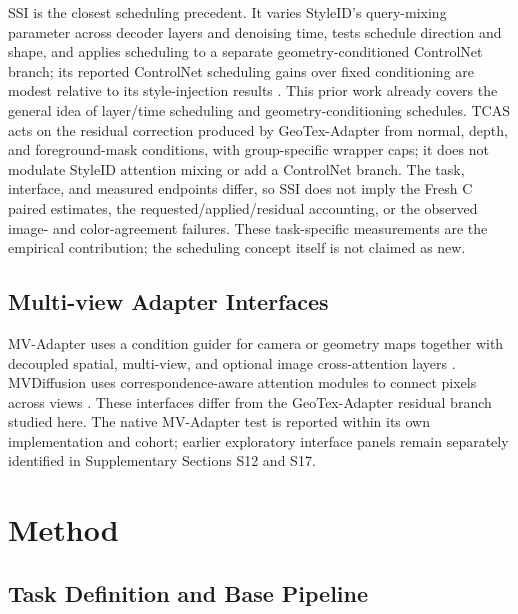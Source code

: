 \documentclass[times,twocolumn,final]{elsarticle}
\providecommand{\DIFadd}[1]{{\protect\color{blue} \sf #1}} %
\providecommand{\DIFaddbegin}{} %
\providecommand{\DIFaddend}{} %
\begin{document}
  \DIFaddbegin \DIFadd{SSI is the closest scheduling precedent. It varies StyleID's query-mixing parameter across decoder layers and denoising time, tests schedule direction and shape, and applies scheduling to a separate }\DIFaddend geometry-conditioned   \DIFaddbegin \DIFadd{ControlNet branch; its reported ControlNet scheduling gains over fixed conditioning are modest relative to its style-injection results \cite{kulkarni2026ssi}. This prior work already covers the general idea of layer/time scheduling and geometry-conditioning schedules. TCAS acts on the residual correction produced by GeoTex-Adapter from normal, depth, and foreground-mask conditions, with group-specific wrapper caps; it does not modulate StyleID attention mixing or add a ControlNet branch. The task, interface, and measured endpoints differ, so SSI does not imply the Fresh C paired estimates, the requested/applied/residual accounting, or the observed image- and color-agreement failures. These task-specific measurements are the empirical contribution; the scheduling concept itself is not claimed as new}\DIFaddend .

  \DIFaddbegin \subsection{Multi-view Adapter Interfaces}
\label{subsec:mvinterfaces}

\DIFadd{MV-Adapter uses a condition guider for camera or geometry maps together with decoupled spatial, multi-view, and optional image cross-attention layers \cite{huang2024mvadapter}. MVDiffusion uses correspondence-aware attention modules to connect pixels across views \cite{tang2023mvdiffusion}. These interfaces differ from the GeoTex-Adapter residual branch studied here. The native MV-Adapter test is reported within its own implementation and cohort; earlier exploratory interface panels remain separately identified in Supplementary Sections S12 and S17}\DIFaddend .

\section{Method}
\label{sec:method}

\subsection{Task Definition and Base Pipeline}
\label{subsec:task}
\end{document}
